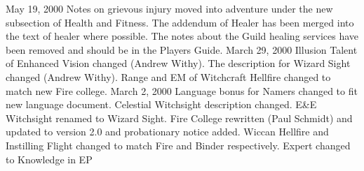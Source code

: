 \documentclass[a4paper]{article}
\begin{document}
\begin{multicols}{3}
May 19, 2000 Notes on grievous injury moved into
adventure under the new subsection of Health and
Fitness. The addendum of Healer has been merged
into the text of healer where possible. The notes
about the Guild healing services have been removed and should be in the Players Guide.
March 29, 2000 Illusion Talent of Enhanced Vision
changed (Andrew Withy). The description for
Wizard Sight changed (Andrew Withy). Range and
EM of Witchcraft Hellfire changed to match new
Fire college.
March 2, 2000 Language bonus for Namers
changed to fit new language document. Celestial
Witchsight description changed. E&E Witchsight
renamed to Wizard Sight. Fire College rewritten
(Paul Schmidt) and updated to version 2.0 and
probationary notice added. Wiccan Hellfire and
Instilling Flight changed to match Fire and Binder
respectively. Expert changed to Knowledge in EP


\end{multicols}
\end{document}
